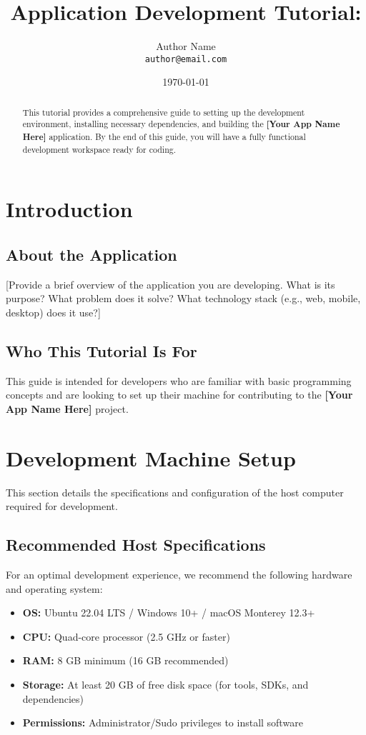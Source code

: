 \documentclass[11pt]{article}
\title{\Huge \textbf{Application Development Tutorial: \\ [CartoonID]}}
\author{Author Name \\ \texttt{author@email.com}}
\date{\today}
\begin{document}
\maketitle

\begin{abstract}
This tutorial provides a comprehensive guide to setting up the development environment, installing necessary dependencies, and building the \textbf{[Your App Name Here]} application. By the end of this guide, you will have a fully functional development workspace ready for coding.
\end{abstract}

\tableofcontents
\newpage

\section{Introduction}
\subsection{About the Application}
[Provide a brief overview of the application you are developing. What is its purpose? What problem does it solve? What technology stack (e.g., web, mobile, desktop) does it use?]

\subsection{Who This Tutorial Is For}
This guide is intended for developers who are familiar with basic programming concepts and are looking to set up their machine for contributing to the \textbf{[Your App Name Here]} project.

\section{Development Machine Setup}
This section details the specifications and configuration of the host computer required for development.

\subsection{Recommended Host Specifications}
For an optimal development experience, we recommend the following hardware and operating system:

\begin{itemize}
    \item \textbf{OS:} Ubuntu 22.04 LTS / Windows 10+ / macOS Monterey 12.3+
    \item \textbf{CPU:} Quad-core processor (2.5 GHz or faster)
    \item \textbf{RAM:} 8 GB minimum (16 GB recommended)
    \item \textbf{Storage:} At least 20 GB of free disk space (for tools, SDKs, and dependencies)
    \item \textbf{Permissions:} Administrator/Sudo privileges to install software
\end{itemize}
\end{document}
